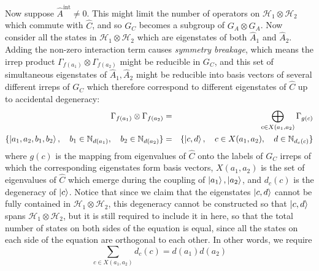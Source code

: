 \documentclass[12pt]{article}
\begin{document}
	Now suppose $\hat{A}^{\text{int}}\neq 0$. This might limit the number of operators on $\mathcal{H}_1\otimes\mathcal{H}_2$ which commute with $\hat{C}$, and so $G_C$ becomes a subgroup of $G_A\otimes G_A$. Now consider all the states in $\mathcal{H}_1\otimes\mathcal{H}_2$ which are eigenstates of both $\hat{A}_1$ and $\hat{A}_2$. Adding the non-zero interaction term causes \textit{symmetry breakage}, which means the irrep product $\Gamma_{f(a_1)}\otimes\Gamma_{f(a_2)}$ might be reducible in $G_C$, and this set of simultaneous eigenstates of $\hat{A}_1,\hat{A}_2$ might be reducible into basis vectors of several different irreps of $G_C$ which therefore correspond to different eigenstates of $\hat{C}$ up to accidental degeneracy:
	\begin{eqnarray*}
	\Gamma_{f(a_1)}\otimes\Gamma_{f(a_2)}&=&\bigoplus_{c\in X(a_1,a_2)} \Gamma_{g(c)}\\
	\{\ket{a_1,a_2,b_1,b_2},\quad b_1\in\mathbb{N}_{d(a_1)},\quad b_2\in\mathbb{N}_{d(a_2)}\}&=&\{\ket{c,d},\quad c\in X(a_1,a_2),\quad d\in\mathbb{N}_{d_c(c)}\}
	\end{eqnarray*}
	where $g(c)$ is the mapping from eigenvalues of $\hat{C}$ onto the labels of $G_C$ irreps of which the corresponding eigenstates form basis vectors, $X(a_1,a_2)$ is the set of eigenvalues of $\hat{C}$ which emerge during the coupling of $\ket{a_1},\ket{a_2}$, and $d_c(c)$ is the degeneracy of $\ket{c}$. Notice that since we claim that the eigenstates $\ket{c,d}$ cannot be fully contained in $\mathcal{H}_1\otimes\mathcal{H}_2$, this degeneracy cannot be constructed so that $\ket{c,d}$ spans $\mathcal{H}_1\otimes\mathcal{H}_2$, but it is still required to include it in here, so that the total number of states on both sides of the equation is equal, since all the states on each side of the equation are orthogonal to each other. In other words, we require
	$$\sum_{c\in X(a_1,a_2)}d_c(c)=d(a_1)d(a_2)$$
	
\end{document}
